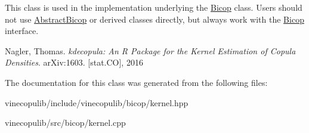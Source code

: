 This class is used in the implementation underlying the \hyperlink{classvinecopulib_1_1_bicop}{Bicop} class. Users should not use \hyperlink{classvinecopulib_1_1_abstract_bicop}{Abstract\+Bicop} or derived classes directly, but always work with the \hyperlink{classvinecopulib_1_1_bicop}{Bicop} interface.

Nagler, Thomas. {\itshape kdecopula\+: An R Package for the Kernel Estimation of Copula Densities}. ar\+Xiv\+:1603. \mbox{[}stat.\+C\+O\mbox{]}, 2016 

The documentation for this class was generated from the following files\+:\begin{DoxyCompactItemize}
\item 
vinecopulib/include/vinecopulib/bicop/kernel.\+hpp\item 
vinecopulib/src/bicop/kernel.\+cpp\end{DoxyCompactItemize}
